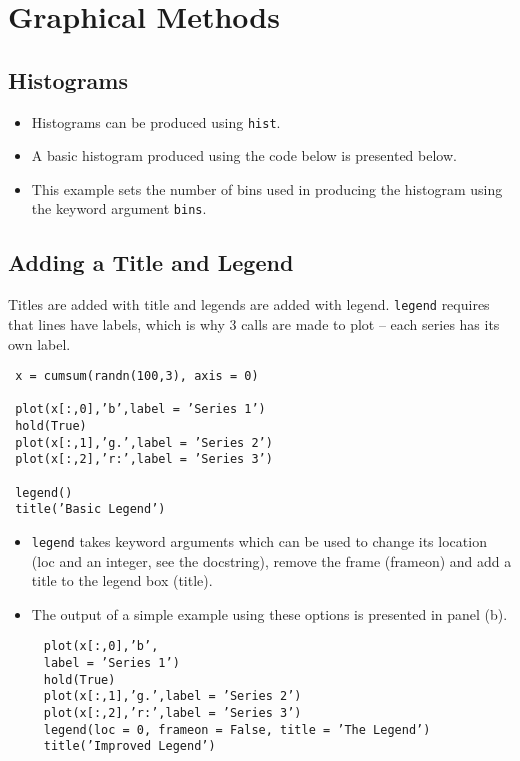 \documentclass[KSmain.tex]{subfiles}
\begin{document}
 
	\newpage
	\section*{Graphical Methods}
\subsection*{Histograms}
\begin{itemize}
	\item Histograms can be produced using \texttt{hist}. 
	\item A basic histogram produced using the code below is presented
	below.
	
	\item  This example sets the number of bins used in producing the histogram using the
	keyword argument \texttt{bins}.
\end{itemize}
\subsection*{Adding a Title and Legend}
Titles are added with title and legends are added with legend. \texttt{legend} requires that lines have labels,
which is why 3 calls are made to plot – each series has its own label.

\begin{framed}
	\begin{verbatim}
 x = cumsum(randn(100,3), axis = 0)
 
 plot(x[:,0],’b’,label = ’Series 1’)
 hold(True)
 plot(x[:,1],’g.’,label = ’Series 2’)
 plot(x[:,2],’r:’,label = ’Series 3’)
 
 legend()
 title(’Basic Legend’)
	\end{verbatim}
\end{framed}

\begin{itemize}
\item \texttt{legend} takes keyword arguments which can be used to change its location (loc and an integer, see the
docstring), remove the frame (frameon) and add a title to the legend box (title). 
\item The output of a simple
example using these options is presented in panel (b).
\end{itemize}

\begin{framed}
	\begin{verbatim}
	 plot(x[:,0],’b’,
	 label = ’Series 1’)
	 hold(True)
	 plot(x[:,1],’g.’,label = ’Series 2’)
	 plot(x[:,2],’r:’,label = ’Series 3’)
	 legend(loc = 0, frameon = False, title = ’The Legend’)
	 title(’Improved Legend’)
	\end{verbatim}
\end{framed}
\end{document}
